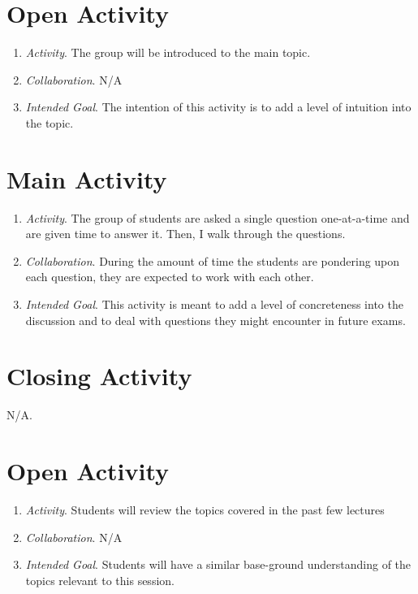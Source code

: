 \documentclass[11pt]{article}
\begin{document}
\newpage
{}
\section{\centering Open Activity}
	\begin{enumerate}
		\item \textit{Activity}. The group will be introduced to the main topic.
		\item \textit{Collaboration}. \textsc{N/A}
		\item \textit{Intended Goal}. The intention of this activity is to add a level of intuition into the topic.
	\end{enumerate}

\section{\centering Main Activity}
	\begin{enumerate}
		\item \textit{Activity}. The group of students are asked a single question one-at-a-time and are given time to answer it. Then, I walk through the 
			questions.
		\item \textit{Collaboration}. During the amount of time the students are pondering upon each question, they are expected to work with each other.
		\item \textit{Intended Goal}. This activity is meant to add a level of concreteness into the discussion and to deal with questions they might encounter
			in future exams.
	\end{enumerate}

\section{\centering Closing Activity}
	N/A.

\newpage
{}
\section{\centering Open Activity}
	\begin{enumerate}
		\item \textit{Activity}. Students will review the topics covered in the past few lectures
		\item \textit{Collaboration}. \textsc{N/A}
		\item \textit{Intended Goal}. Students will have a similar base-ground understanding of the topics relevant to this session.
	\end{enumerate}
\end{document}
